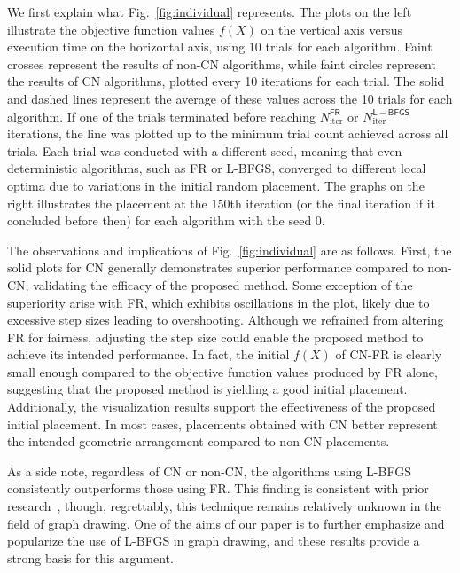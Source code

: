 \documentclass[dvipdfmx,10pt,journal,compsoc]{IEEEtran}
\begin{document}
We first explain what Fig.~\ref{fig:individual} represents.
The plots on the left illustrate the objective function values $f(X)$ on the vertical axis versus execution time on the horizontal axis, using 10 trials for each algorithm.
Faint crosses represent the results of non-\textsf{CN} algorithms, while faint circles represent the results of \textsf{CN} algorithms, plotted every 10 iterations for each trial.
The solid and dashed lines represent the average of these values across the 10 trials for each algorithm.
If one of the trials terminated before reaching $N_\mathrm{iter}^\mathsf{FR}$ or $N_\mathrm{iter}^\mathsf{L-BFGS}$ iterations, the line was plotted up to the minimum trial count achieved across all trials.
Each trial was conducted with a different seed, meaning that even deterministic algorithms, such as
\textsf{FR} or \textsf{L-BFGS}, converged to different local optima due to variations in the initial random placement.
The graphs on the right illustrates the placement at the 150th iteration (or the final iteration if it concluded before then) for each algorithm with the seed 0.

The observations and implications of Fig.~\ref{fig:individual} are as follows.
First, the solid plots for \textsf{CN} generally demonstrates superior performance compared to non-\textsf{CN}, validating the efficacy of the proposed method.
Some exception of the superiority arise with \textsf{FR}, which exhibits oscillations in the plot, likely due to excessive step sizes leading to overshooting.
Although we refrained from altering \textsf{FR} for fairness, adjusting the step size could enable the proposed method to achieve its intended performance.
In fact, the initial $f(X)$ of \textsf{CN-FR} is clearly small enough compared to the objective function values produced by \textsf{FR} alone, suggesting that the proposed method is yielding a good initial placement.
Additionally, the visualization results support the effectiveness of the proposed initial placement. In most cases, placements obtained with \textsf{CN} better represent the intended geometric arrangement compared to non-\textsf{CN} placements.

As a side note, regardless of \textsf{CN} or non-\textsf{CN}, the algorithms using \textsf{L-BFGS} consistently outperforms those using \textsf{FR}.
This finding is consistent with prior research~\cite{6183577}, though, regrettably, this technique remains relatively unknown in the field of graph drawing.
One of the aims of our paper is to further emphasize and popularize the use of \textsf{L-BFGS} in graph drawing, and these results provide a strong basis for this argument.
\end{document}
